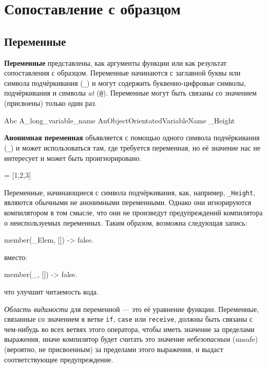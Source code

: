\chapter{Сопоставление с образцом}
\label{patterns}

\section{Переменные}
\label{patterns:variables}

\textbf{Переменные} представлены, как аргументы функции или как результат 
сопоставления с образцом. Переменные начинаются с заглавной буквы или символа
подчёркивания (\texttt{\_}) и могут содержить буквенно-цифровые символы, 
подчёркивания и символы \emph{at} (\texttt{@}). Переменные могут быть связаны со 
значением (присвоены) только один раз.

\begin{erlang}
Abc
A_long_variable_name
AnObjectOrientatedVariableName
_Height
\end{erlang}

\textbf{Анонимная переменная} объявляется с помощью одного символа подчёркивания
(\texttt{\_}) и может использоваться там, где требуется переменная, но её значение
нас не интересует и может быть проигнорировано.

\begin{erlang}
[H|_] = [1,2,3]         %
\end{erlang}

Переменные, начинающиеся с символа подчёркивания, как, например, \texttt{\_Height},
являются обычными не анонимными переменными.  Однако они игнорируются компилятором
в том смысле, что они не произведут предупреждений компилятора о неиспользуемых
переменных.  Таким образом, возможна следующая запись:

\begin{erlang}
member(_Elem, []) ->
    false.
\end{erlang}

вместо:

\begin{erlang}
member(_, []) ->
    false.
\end{erlang}

что улучшит читаемость кода.

\textit{Область видимости} для переменной --- это её уравнение функции.  
Переменные, связанные со значением в ветке \texttt{if}, \texttt{case} или 
\texttt{receive}, должны быть связаны с чем-нибудь во всех ветвях этого оператора,
чтобы иметь значение за пределами выражения, иначе компилятор будет считать это
значение \textit{небезопасным} (unsafe) (вероятно, не присвоенным) за пределами
этого выражения, и выдаст соответствующее предупреждение.



